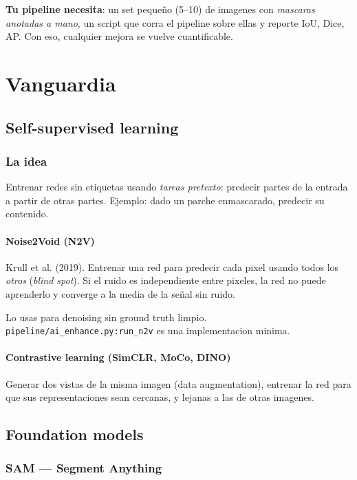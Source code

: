 \documentclass[11pt,a4paper,twoside,openright]{book}
\begin{document}
\textbf{Tu pipeline necesita}: un set pequeño (5--10) de imagenes con \emph{mascaras anotadas a mano}, un script que corra el pipeline sobre ellas y reporte IoU, Dice, AP. Con eso, cualquier mejora se vuelve cuantificable.

\part{Vanguardia}

\chapter{Self-supervised learning}

\section{La idea}

Entrenar redes sin etiquetas usando \emph{tareas pretexto}: predecir partes de la entrada a partir de otras partes. Ejemplo: dado un parche enmascarado, predecir su contenido.

\subsection{Noise2Void (N2V)}

Krull et al. (2019). Entrenar una red para predecir cada pixel usando todos los \emph{otros} (\emph{blind spot}). Si el ruido es independiente entre pixeles, la red no puede aprenderlo y converge a la media de la señal sin ruido.

Lo usas para denoising sin ground truth limpio. \texttt{pipeline/ai\_enhance.py:run\_n2v} es una implementacion minima.

\subsection{Contrastive learning (SimCLR, MoCo, DINO)}

Generar dos vistas de la misma imagen (data augmentation), entrenar la red para que sus representaciones sean cercanas, y lejanas a las de otras imagenes.

\chapter{Foundation models}

\section{SAM --- Segment Anything}
\end{document}
